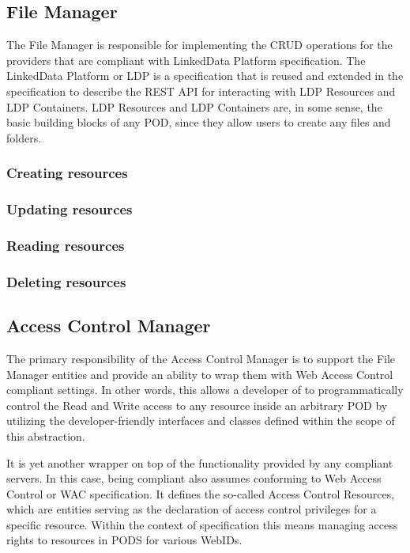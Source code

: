\subsection{File Manager}
The File Manager is responsible for implementing the CRUD operations for the \solid{}  providers that are compliant with LinkedData Platform specification. The LinkedData Platform or LDP is a specification that is reused and extended in the \solid{} specification to describe the REST API for interacting with LDP Resources and LDP Containers. LDP Resources and LDP Containers are, in some sense, the basic building blocks of any \solid{} POD, since they allow users to create any files and folders.

\subsubsection{Creating resources}

\subsubsection{Updating resources}

\subsubsection{Reading resources}

\subsubsection{Deleting resources}

\subsection{Access Control Manager}

The primary responsibility of the Access Control Manager is to support the File Manager entities and provide an ability to wrap them with Web Access Control compliant settings. In other words, this allows a developer of \lpa{} to programmatically control the Read and Write access to any resource inside an arbitrary \solid{} POD by utilizing the developer-friendly interfaces and classes defined within the scope of this abstraction.

It is yet another wrapper on top of the functionality provided by any \solid{} compliant servers. In this case, being \solid{} compliant also assumes conforming to Web Access Control or WAC specification. It defines the so-called Access Control Resources, which are entities serving as the declaration of access control privileges for a specific resource. Within the context of \solid{} specification this means managing access rights to resources in \solid{} PODS for various WebIDs.